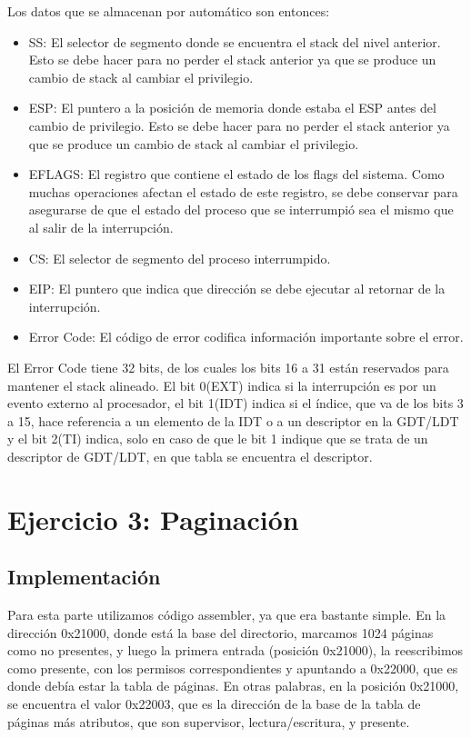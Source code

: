 \documentclass[10pt, a4paper]{article}
\begin{document}
Los datos que se almacenan por automático son entonces:
\begin{itemize}
	\item SS: El selector de segmento donde se encuentra el stack del nivel anterior. Esto se debe hacer para no perder el stack anterior ya que se produce un cambio de stack al cambiar el privilegio.
	\item ESP: El puntero a la posición de memoria donde estaba el ESP antes del cambio de privilegio. Esto se debe hacer para no perder el stack anterior ya que se produce un cambio de stack al cambiar el privilegio.
	\item EFLAGS: El registro que contiene el estado de los flags del sistema. Como muchas operaciones afectan el estado de este registro, se debe conservar para asegurarse de que el estado del proceso que se interrumpió sea el mismo que al salir de la interrupción.
	\item CS: El selector de segmento del proceso interrumpido.
	\item EIP: El puntero que indica que dirección se debe ejecutar al retornar de la interrupción.
	\item Error Code: El código de error codifica información importante sobre el error.
\end{itemize}

El Error Code tiene 32 bits, de los cuales los bits 16 a 31 están reservados para mantener el stack alineado. El bit 0(EXT) indica si la interrupción es por un evento externo al procesador, el bit 1(IDT) indica si el índice, que va de los bits 3 a 15, hace referencia a un elemento de la IDT o a un descriptor en la GDT/LDT y el bit 2(TI) indica, solo en caso de que le bit 1 indique que se trata de un descriptor de GDT/LDT, en que tabla se encuentra el descriptor.


\section{Ejercicio 3: Paginación}
\subsection{Implementación}
Para esta parte utilizamos código assembler, ya que era bastante simple. En la dirección 0x21000, donde está la base del directorio, marcamos 1024 páginas como no presentes, y luego la primera entrada (posición 0x21000), la reescribimos como presente, con los permisos correspondientes y apuntando a 0x22000, que es donde debía estar la tabla de páginas. En otras palabras, en la posición 0x21000, se encuentra el valor 0x22003, que es la dirección de la base de la tabla de páginas más atributos, que son supervisor, lectura/escritura, y presente.
\end{document}
